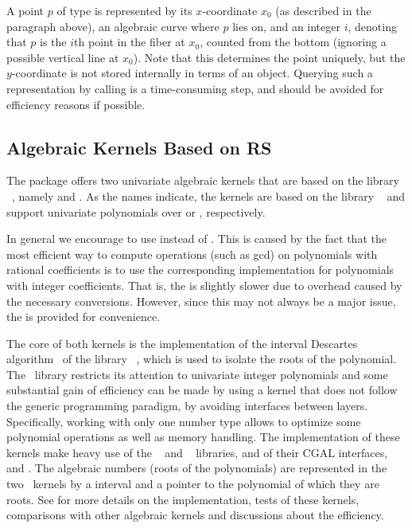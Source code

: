 A point $p$ of type  is represented
by its $x$-coordinate $x_0$ (as described in the 
paragraph above), an algebraic curve where $p$ lies on, and an
integer $i$, denoting that $p$ is the $i$th point in the fiber at $x_0$,
counted from the bottom (ignoring a possible vertical line at $x_0$).
Note that this determines the point uniquely, but the $y$-coordinate 
is not stored internally in terms of an  object.
Querying such a representation by calling  is a
time-consuming step, and should be avoided for efficiency reasons if possible.


\subsection{Algebraic Kernels Based on RS}

The package offers two univariate algebraic kernels that are based on 
the library \rs~\cite{cgal:r-rs}, namely 
and . As the names indicate, 
the kernels are based on the library \rs~\cite{cgal:r-rs} and support univariate 
polynomials over  or , respectively. 

In general we encourage to use 
instead of . This is caused by
the fact that the most efficient way to compute operations (such as gcd)
on polynomials with rational coefficients is to use the corresponding
implementation for polynomials with integer coefficients.  That is,
the  is slightly slower due to
overhead caused by the necessary conversions.  However, since this may
not always be a major issue, the 
is provided for convenience.


The core of both kernels is the implementation of the interval Descartes 
algorithm~\cite{cgal:rz-jcam-04} of the library \rs~\cite{cgal:r-rs}, 
which is used to isolate the roots of the polynomial. 
The \rs~library restricts its attention to univariate integer
polynomials and some substantial gain of efficiency can be made by using a kernel
that does not follow the generic programming paradigm, by avoiding
interfaces between layers.  Specifically, working with
only one number type allows to optimize some polynomial operations
as well as memory handling.  The implementation of these kernels
make heavy use of the \mpfr~\cite{cgal:mt-mpfr} and \mpfi~\cite{cgal:r-mpfi}
libraries, and of their CGAL interfaces,  and .
The algebraic numbers (roots of the polynomials) are represented
in the two \rs~kernels by a  interval and a pointer to
the polynomial of which they are roots.  See \cite{cgal:lpt-wea-09} 
for more details on the implementation, tests of these kernels,
comparisons with other algebraic kernels and discussions about the
efficiency.  


